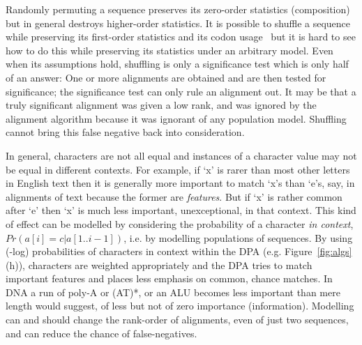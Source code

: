 \documentclass[letterpaper,11pt,oneside]{article}
\begin{document}
Randomly permuting a sequence preserves its zero-order statistics (composition)
but in general destroys higher-order statistics.
It is possible to shuffle a sequence while preserving its first-order
statistics and its codon usage~\cite{fitch83, altschul85} but
it is hard to see how to do this while preserving its statistics under
an arbitrary model.
Even when its assumptions hold,
shuffling is only a significance test which is only half of an answer:
One or more alignments are obtained and are then tested for significance;
the significance test can only rule an alignment out.
It may be that a truly significant alignment was given a low rank,
and was ignored by the alignment algorithm because it was
ignorant of any population model.
Shuffling cannot bring this false negative back into consideration.

In general, characters are not all equal and instances of a character
value may not be equal in different contexts.
For example, if `x' is rarer than most other letters in English text
then it is generally more important to match `x's than `e's, say,
in alignments of text because the former are {\em features}.
But if `x' is rather common after `e'
then `x' is much less important, unexceptional, in that context.
This kind of effect can be modelled by considering the probability
of a character {\em in context}, $Pr(a[i]=c|a[1..i-1])$,
i.e. by modelling populations of sequences.
By using (-log) probabilities of characters in context within the DPA
(e.g. Figure~\ref{fig:algs}(h)), characters are weighted appropriately and the DPA tries
to match important features and places less emphasis on common, chance matches.
In DNA a run of poly-A or (AT)*, or an ALU becomes less important than
mere length would suggest, of less but not of zero importance (information).
Modelling can and should change the rank-order of alignments,
even of just two sequences, and can reduce the chance of false-negatives.
\end{document}

